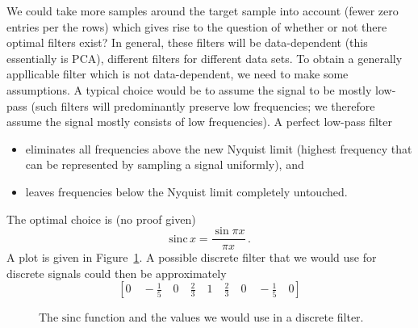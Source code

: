 We could take more samples around the target sample into account (fewer zero
entries per the rows) which gives rise to the question of whether or not there
optimal filters exist? In general, these filters will be data-dependent (this
essentially is PCA), \ie different filters for different data sets. To obtain a
generally appllicable filter which is not data-dependent, we need to make some
assumptions. A typical choice would be to assume the signal to be mostly
low-pass (such filters will predominantly preserve low frequencies; we therefore
assume the signal mostly consists of low frequencies). A perfect low-pass filter
\begin{itemize}
\item eliminates all frequencies above the new Nyquist limit (highest frequency
  that can be represented by sampling a signal uniformly), and
\item leaves frequencies below the Nyquist limit completely untouched.
\end{itemize}
The optimal choice is (no proof given)
\begin{equation*}
  \text{sinc}\,x = \frac{\sin \pi x}{\pi x}\,.
\end{equation*}
A plot is given in Figure~\ref{fig:sinc}. A possible discrete filter that we
would use for discrete signals could then be approximately
\begin{equation*}
  \left[ 0 \quad -\tfrac{1}{5} \quad 0 \quad \tfrac{2}{3} \quad 1 \quad \tfrac{2}{3} \quad 0 \quad -\tfrac{1}{5} \quad 0 \right]
\end{equation*}

\begin{figure}[h!]
\centering
{}%
\caption{The $\text{sinc}$ function and the values we would use in a discrete
    filter.}%
\label{fig:sinc}%
\end{figure}
  
